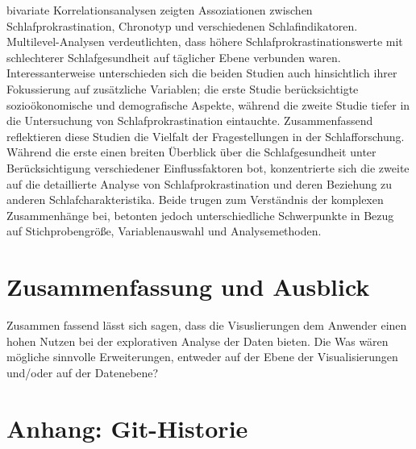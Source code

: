 \documentclass[usegeometry=true]{scrartcl}
\begin{document}
 bivariate Korrelationsanalysen zeigten Assoziationen zwischen Schlafprokrastination, Chronotyp und verschiedenen Schlafindikatoren. 
 Multilevel-Analysen verdeutlichten, dass höhere Schlafprokrastinationswerte mit schlechterer Schlafgesundheit auf täglicher 
 Ebene verbunden waren. Interessanterweise unterschieden sich die beiden Studien auch hinsichtlich ihrer Fokussierung auf 
 zusätzliche Variablen; die erste Studie berücksichtigte sozioökonomische und demografische Aspekte, während die zweite Studie tiefer
  in die Untersuchung von Schlafprokrastination eintauchte.
\newline
Zusammenfassend reflektieren diese Studien die Vielfalt der Fragestellungen in der Schlafforschung. Während die erste einen breiten Überblick über die Schlafgesundheit unter Berücksichtigung verschiedener Einflussfaktoren bot, konzentrierte sich die zweite auf die detaillierte Analyse von Schlafprokrastination und deren Beziehung zu anderen Schlafcharakteristika. Beide trugen zum Verständnis der komplexen Zusammenhänge bei, betonten jedoch unterschiedliche Schwerpunkte in Bezug auf Stichprobengröße, Variablenauswahl und Analysemethoden.

\section{Zusammenfassung und Ausblick}
Zusammen fassend lässt sich sagen, dass die Visuslierungen dem Anwender einen hohen Nutzen bei der explorativen Analyse der Daten bieten.
Die 
Was wären mögliche sinnvolle Erweiterungen, entweder auf der Ebene der Visualisierungen und/oder auf der Datenebene?

\section*{Anhang: Git-Historie}
\end{document}

